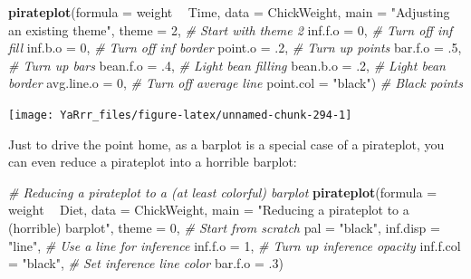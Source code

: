 \documentclass[]{book}
\newenvironment{Shaded}{\begin{snugshade}}{\end{snugshade}}
\newcommand{\KeywordTok}[1]{\textcolor[rgb]{0.13,0.29,0.53}{\textbf{#1}}}
\newcommand{\DataTypeTok}[1]{\textcolor[rgb]{0.13,0.29,0.53}{#1}}
\newcommand{\DecValTok}[1]{\textcolor[rgb]{0.00,0.00,0.81}{#1}}
\newcommand{\StringTok}[1]{\textcolor[rgb]{0.31,0.60,0.02}{#1}}
\newcommand{\CommentTok}[1]{\textcolor[rgb]{0.56,0.35,0.01}{\textit{#1}}}
\newcommand{\OperatorTok}[1]{\textcolor[rgb]{0.81,0.36,0.00}{\textbf{#1}}}
\newcommand{\NormalTok}[1]{#1}
\theoremstyle{definition}
\theoremstyle{definition}
\theoremstyle{remark}
\begin{document}
\begin{Shaded}
\begin{Highlighting}[]
\KeywordTok{pirateplot}\NormalTok{(}\DataTypeTok{formula =}\NormalTok{ weight }\OperatorTok{~}\StringTok{ }\NormalTok{Time,}
           \DataTypeTok{data =}\NormalTok{ ChickWeight,}
           \DataTypeTok{main =} \StringTok{"Adjusting an existing theme"}\NormalTok{,}
           \DataTypeTok{theme =} \DecValTok{2}\NormalTok{,  }\CommentTok{# Start with theme 2}
           \DataTypeTok{inf.f.o =} \DecValTok{0}\NormalTok{, }\CommentTok{# Turn off inf fill}
           \DataTypeTok{inf.b.o =} \DecValTok{0}\NormalTok{, }\CommentTok{# Turn off inf border}
           \DataTypeTok{point.o =}\NormalTok{ .}\DecValTok{2}\NormalTok{,   }\CommentTok{# Turn up points}
           \DataTypeTok{bar.f.o =}\NormalTok{ .}\DecValTok{5}\NormalTok{, }\CommentTok{# Turn up bars}
           \DataTypeTok{bean.f.o =}\NormalTok{ .}\DecValTok{4}\NormalTok{, }\CommentTok{# Light bean filling}
           \DataTypeTok{bean.b.o =}\NormalTok{ .}\DecValTok{2}\NormalTok{, }\CommentTok{# Light bean border}
           \DataTypeTok{avg.line.o =} \DecValTok{0}\NormalTok{, }\CommentTok{# Turn off average line}
           \DataTypeTok{point.col =} \StringTok{"black"}\NormalTok{) }\CommentTok{# Black points}
\end{Highlighting}
\end{Shaded}

\begin{center}\texttt{[image: YaRrr\_files/figure-latex/unnamed-chunk-294-1]} \end{center}

Just to drive the point home, as a barplot is a special case of a
pirateplot, you can even reduce a pirateplot into a horrible barplot:

\begin{Shaded}
\begin{Highlighting}[]
\CommentTok{# Reducing a pirateplot to a (at least colorful) barplot}
\KeywordTok{pirateplot}\NormalTok{(}\DataTypeTok{formula =}\NormalTok{ weight }\OperatorTok{~}\StringTok{ }\NormalTok{Diet,}
           \DataTypeTok{data =}\NormalTok{ ChickWeight,}
           \DataTypeTok{main =} \StringTok{"Reducing a pirateplot to a (horrible) barplot"}\NormalTok{,}
           \DataTypeTok{theme =} \DecValTok{0}\NormalTok{,                                    }\CommentTok{# Start from scratch}
           \DataTypeTok{pal =} \StringTok{"black"}\NormalTok{,}
           \DataTypeTok{inf.disp =} \StringTok{"line"}\NormalTok{,                            }\CommentTok{# Use a line for inference}
           \DataTypeTok{inf.f.o =} \DecValTok{1}\NormalTok{,                                  }\CommentTok{# Turn up inference opacity}
           \DataTypeTok{inf.f.col =} \StringTok{"black"}\NormalTok{,                          }\CommentTok{# Set inference line color}
           \DataTypeTok{bar.f.o =}\NormalTok{ .}\DecValTok{3}\NormalTok{)                                }
\end{Highlighting}
\end{Shaded}
\end{document}
